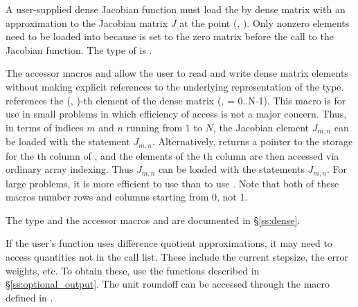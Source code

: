 {
  A user-supplied dense Jacobian function must load the  by 
  dense matrix  with an approximation to the Jacobian matrix $J$
  at the point (, ).  Only nonzero elements need to be loaded
  into  because  is set to the zero matrix before the call
  to the Jacobian function. The type of  is . 
  
  The accessor macros  and  allow the user to
  read and write dense matrix elements without making explicit
  references to the underlying representation of the 
  type.  references the (, )-th
  element of the dense matrix  (,  = 0..N-1). This macro
  is for use in small problems in which efficiency of access is not a major
  concern.  Thus, in terms of indices $m$ and $n$ running from $1$ to
  $N$, the Jacobian element $J_{m,n}$ can be loaded with the statement
   $J_{m,n}$.  Alternatively,
   returns a pointer to the storage for
  the th column of , and the elements of the th column
  are then accessed via ordinary array indexing.  Thus $J_{m,n}$ can be 
  loaded with the statements 
   $J_{m,n}$.  For large problems, it is more 
  efficient to use  than to use . 
  Note that both of these macros number rows and columns
  starting from $0$, not $1$.  

  The  type and the accessor macros  and 
   are documented in \S\ref{ss:dense}.

  If the user's  function uses difference quotient approximations,
  it may need to access quantities not in the call list. These include the current
  stepsize, the error weights, etc. To obtain these, use the  functions 
  described in \S\ref{ss:optional_output}. The unit roundoff can be accessed through
  the macro  defined in .
}
